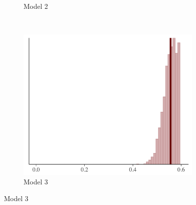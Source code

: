 \documentclass[10pt,handout]{beamer}
\begin{document}
\begin{frame}
\begin{figure}
\begin{subfigure}{0.31\textwidth}
\caption{Model 2}
\end{subfigure}
~
\begin{subfigure}{0.31\textwidth}
\includegraphics[width=\textwidth]{figs/ppc_skew3.png}
\caption{Model 3}
\end{subfigure}

\end{figure}

\end{frame}
\end{document}
